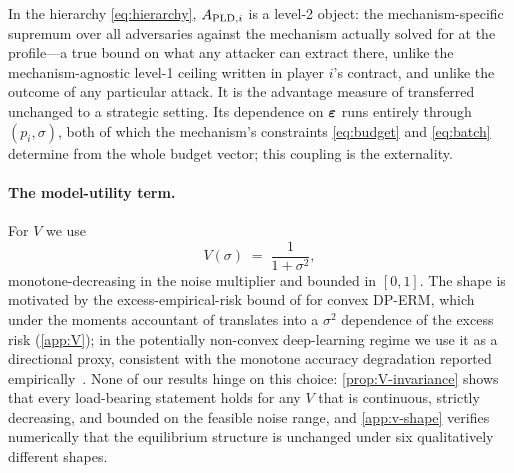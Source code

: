 
In the hierarchy \eqref{eq:hierarchy}, $A_{\mathrm{PLD},i}$ is a level-2 object:
the mechanism-specific supremum over all adversaries against the
mechanism actually solved for at the profile---a true bound on what
any attacker can extract there, unlike the mechanism-agnostic level-1
ceiling written in player $i$'s contract, and unlike the outcome of
any particular attack.
It is the advantage measure of \citet{kaiser2026your} transferred
unchanged to a strategic setting. Its dependence on
$\boldsymbol{\varepsilon}$ runs entirely through $(p_i, \sigma)$, both of
which the mechanism's constraints \eqref{eq:budget} and \eqref{eq:batch} determine from
the whole budget vector; this coupling is the externality.

\paragraph{The model-utility term.} For $V$ we use
\begin{equation}
V(\sigma) \;=\; \frac{1}{1 + \sigma^2},
\label{eq:V}
\end{equation}
monotone-decreasing in the noise multiplier and bounded in $[0,1]$.
The shape is motivated by the excess-empirical-risk bound of
\citet{bassily2014private} for convex DP-ERM, which under the moments
accountant of \citet{abadi2016deep} translates into a $\sigma^2$
dependence of the excess risk (\cref{app:V}); in the potentially
non-convex deep-learning regime we use it as a directional proxy,
consistent with the monotone accuracy degradation reported
empirically~\cite{tramer2021private, abadi2016deep, boenisch2023have}.
None of our results hinge on this choice:
\cref{prop:V-invariance} shows that every load-bearing statement holds
for any $V$ that is continuous, strictly decreasing, and bounded on
the feasible noise range, and \cref{app:v-shape} verifies numerically
that the equilibrium structure is unchanged under six qualitatively
different shapes.


